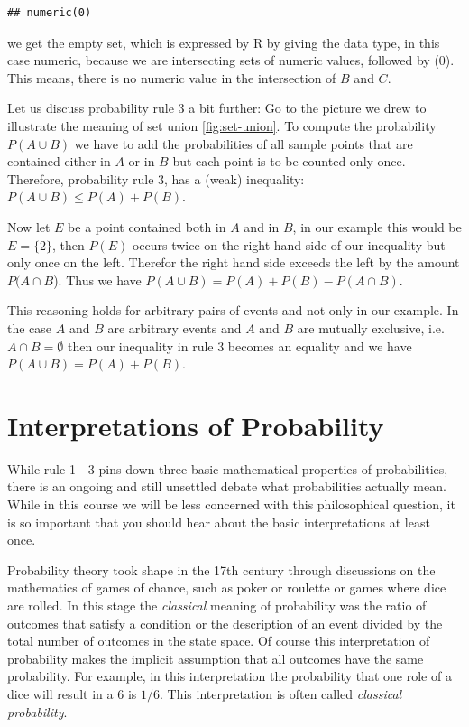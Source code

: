 \documentclass[
]{book}
\begin{document}
\begin{verbatim}
## numeric(0)
\end{verbatim}

we get the empty set, which is expressed by R by giving the data type, in this
case numeric, because we are intersecting sets of numeric values, followed by (0). This means,
there is no numeric value in the intersection of \(B\) and \(C\).

Let us discuss probability rule 3 a bit further: Go to the picture we drew to
illustrate the meaning of set union \ref{fig:set-union}. To compute the probability \(P(A \cup B)\)
we have to add the probabilities of all sample points that are contained either in \(A\) or in \(B\)
but each point is to be counted only once. Therefore, probability rule 3, has a (weak)
inequality: \(P(A \cup B) \leq P(A) + P(B)\).

Now let \(E\) be a point contained both in \(A\) and in \(B\), in our example this would be \(E = \{2\}\),
then \(P(E)\) occurs twice on the right hand side of our inequality but only once on the left.
Therefor the right hand side exceeds the left by the amount \(P(A \cap B\)). Thus we have
\(P(A \cup B) = P(A) + P(B) - P(A \cap B)\).

This reasoning holds for arbitrary pairs of events and not only in our example. In the
case \(A\) and \(B\) are arbitrary events and \(A\) and \(B\) are mutually exclusive,
i.e.~\(A \cap B = \emptyset\) then our inequality in rule 3 becomes an equality and we have
\(P(A \cup B) = P(A) + P(B)\).

\hypertarget{interpretations-of-probability}{%
\section{Interpretations of Probability}\label{interpretations-of-probability}}

While rule 1 - 3 pins down three basic mathematical properties of probabilities, there is an
ongoing and still unsettled debate what probabilities actually mean. While in this course we
will be less concerned with this philosophical question, it is so important that you
should hear about
the basic interpretations at least once.

Probability theory took shape in the 17th century through discussions on the mathematics of
games of chance, such as poker or roulette or games where dice are rolled. In this
stage the \emph{classical} meaning of probability was the ratio of outcomes that satisfy a condition
or the description of an event divided by the total number of outcomes in the state space. Of
course this interpretation of probability makes the implicit assumption that all outcomes
have the same probability. For example, in this interpretation the probability that one role
of a dice will result in a \(6\) is \(1/6\). This interpretation is often called
\emph{classical probability}.
\end{document}
